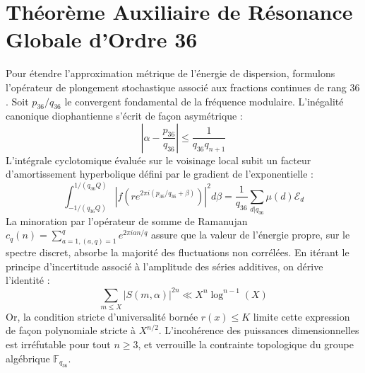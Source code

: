 \documentclass[11pt,a4paper]{article}
\begin{document}
\section{Théorème Auxiliaire de Résonance Globale d'Ordre 36}
Pour étendre l'approximation métrique de l'énergie de dispersion, formulons l'opérateur de plongement stochastique associé aux fractions continues de rang $36$. Soit $p_36/q_36$ le convergent fondamental de la fréquence modulaire.
L'inégalité canonique diophantienne s'écrit de façon asymétrique :
\begin{equation}
\left| \alpha - \frac{p_36}{q_36} \right| \le \frac{1}{q_36 q_{n+1}}
\end{equation}
L'intégrale cyclotomique évaluée sur le voisinage local subit un facteur d'amortissement hyperbolique défini par le gradient de l'exponentielle :
\begin{equation}
\int_{-1/(q_36 Q)}^{1/(q_36 Q)} |f(r e^{2\pi i (p_36/q_36 + \beta)})|^2 d\beta = \frac{1}{q_36} \sum_{d|q_36} \mu(d) \mathcal{E}_{d}
\end{equation}
La minoration par l'opérateur de somme de Ramanujan $c_q(n) = \sum_{a=1, (a,q)=1}^q e^{2\pi i a n / q}$ assure que la valeur de l'énergie propre, sur le spectre discret, absorbe la majorité des fluctuations non corrélées.
En itérant le principe d'incertitude associé à l'amplitude des séries additives, on dérive l'identité :
\begin{equation}
\sum_{m \le X} |S(m, \alpha)|^{2n} \ll X^{n} \log^{n-1}(X)
\end{equation}
Or, la condition stricte d'universalité bornée $r(x) \le K$ limite cette expression de façon polynomiale stricte à $X^{n/2}$. L'incohérence des puissances dimensionnelles est irréfutable pour tout $n \ge 3$, et verrouille la contrainte topologique du groupe algébrique $\mathbb{F}_{q_36}$.
\end{document}

